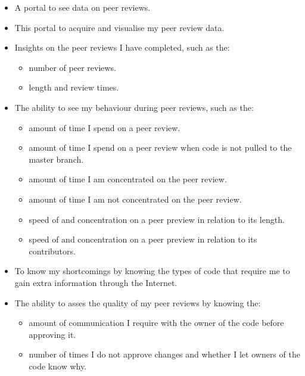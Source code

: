 \documentclass{article}
\begin{document}
    \begin{itemize}
        \item A portal to see data on peer reviews.
        \item This portal to acquire and visualise my peer review data.
        \item Insights on the peer reviews I have completed, such as the:
            \begin{itemize}
                \item number of peer reviews.
                \item length and review times.
            \end{itemize}
        \item The ability to see my behaviour during peer reviews, such as the:
            \begin{itemize}
                \item amount of time I spend on a peer review.
                \item amount of time I spend on a peer review when code is not pulled to the master branch.
                \item amount of time I am concentrated on the peer review.
                \item amount of time I am not concentrated on the peer review.
                \item speed of and concentration on a peer preview in relation to its length.          
                \item speed of and concentration on a peer preview in relation to its contributors. 
            \end{itemize}
            \item To know my shortcomings by knowing the types of code that require me to gain extra information through the Internet.
        \item The ability to asses the quality of my peer reviews by knowing the:
            \begin{itemize}
                \item amount of communication I require with the owner of the code before approving it.
                \item number of times I do not approve changes and whether I let owners of the code know why.
            \end{itemize}
    \end{itemize}
    
\end{document}
